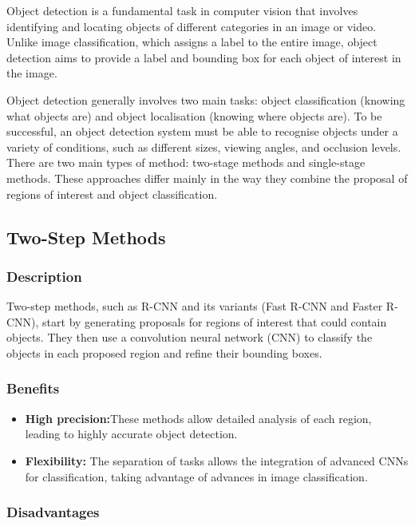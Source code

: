 \documentclass[12pt,oneside]{book} %
\begin{document}
Object detection is a fundamental task in computer vision that involves
identifying and locating objects of different categories in an image or video.
Unlike image classification, which assigns a label to the entire image, object
detection aims to provide a label and bounding box for each object of interest
in the image.

Object detection generally involves two main tasks: object classification
(knowing what objects are) and object localisation (knowing where objects are).
To be successful, an object detection system must be able to recognise objects
under a variety of conditions, such as different sizes, viewing angles, and
occlusion levels. There are two main types of method: two-stage methods and
single-stage methods. These approaches differ mainly in the way they combine
the proposal of regions of interest and object classification.

\subsection{Two-Step Methods}

\subsubsection{Description}

Two-step methods, such as R-CNN and its variants (Fast R-CNN and Faster R-CNN),
start by generating proposals for regions of interest that could contain
objects. They then use a convolution neural network (CNN) to classify the
objects in each proposed region and refine their bounding boxes.

\subsubsection{Benefits}

\begin{itemize}
    \item \textbf{High precision:}These methods allow detailed analysis of each region, leading to highly accurate object detection.
    \item \textbf{Flexibility:} The separation of tasks allows the integration of advanced CNNs for classification, taking advantage of advances in image classification.
\end{itemize}

\subsubsection{Disadvantages}
\end{document}
